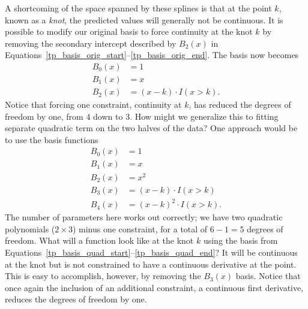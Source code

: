 \documentclass[12pt,hidelinks]{article}
\numberwithin{equation}{section}
\begin{document}
A shortcoming of the space spanned by these splines is that at the
point $k$, known as a \textit{knot}, the predicted values will
generally not be continuous. It is possible to modify our
original basis to force continuity at the knot $k$ by removing
the secondary intercept described by $B_2(x)$ in
Equations~\ref{tp_basis_orig_start}--\ref{tp_basis_orig_end}.
The basis now becomes
\begin{align}
B_0(x) &= 1 \\
B_1(x) &= x \\
B_2(x) &= (x - k) \cdot I(x > k).
\end{align}
Notice that forcing one constraint, continuity at $k$, has reduced
the degrees of freedom by one, from $4$ down to $3$. How might we
generalize this to fitting separate quadratic term on the two halves
of the data? One approach would be to use the basis functions
\begin{align}
B_0(x) &= 1 \label{tp_basis_quad_start} \\
B_1(x) &= x \\
B_2(x) &= x^2 \\
B_3(x) &= (x - k) \cdot I(x > k) \\
B_4(x) &= (x - k)^2 \cdot I(x > k). \label{tp_basis_quad_end}
\end{align}
The number of parameters here works out correctly; we have two
quadratic polynomials ($2 \times 3$) minus one constraint, for a
total of $6-1=5$ degrees of freedom. What will a function look like
at the knot $k$ using the basis from
Equations~\ref{tp_basis_quad_start}--\ref{tp_basis_quad_end}?
It will be continuous at the knot but is not constrained to have
a continuous derivative at the point. This is easy to accomplish,
however, by removing the $B_3(x)$ basis.
Notice that once again the inclusion of an additional constraint,
a continuous first derivative, reduces the degrees of freedom by
one.
\end{document}
